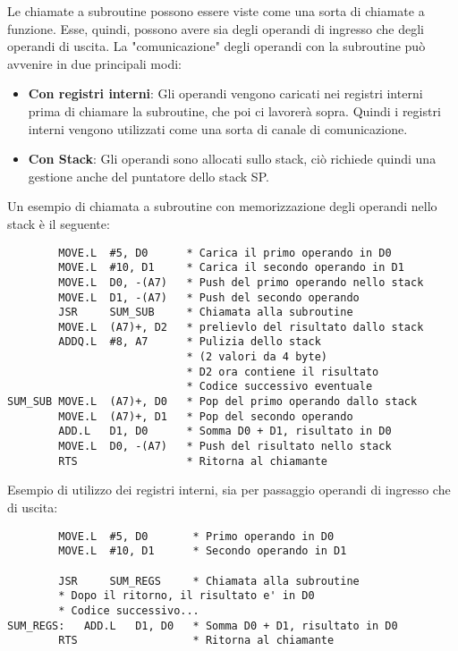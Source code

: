 Le chiamate a subroutine possono essere viste come una sorta di chiamate a funzione. Esse, quindi, possono avere sia degli operandi di ingresso che degli operandi di uscita. La "comunicazione" degli operandi con la subroutine può avvenire in due principali modi:
\begin{itemize}
    \item \textbf{Con registri interni}: Gli operandi vengono caricati nei registri interni prima di chiamare la subroutine, che poi ci lavorerà sopra. Quindi i registri interni vengono utilizzati come una sorta di canale di comunicazione.
    \item \textbf{Con Stack}: Gli operandi sono allocati sullo stack, ciò richiede quindi una gestione anche del puntatore dello stack SP.
\end{itemize}

Un esempio di chiamata a subroutine con memorizzazione degli operandi nello stack è il seguente:
\begin{lstlisting}
        MOVE.L  #5, D0      * Carica il primo operando in D0
        MOVE.L  #10, D1     * Carica il secondo operando in D1
        MOVE.L  D0, -(A7)   * Push del primo operando nello stack
        MOVE.L  D1, -(A7)   * Push del secondo operando
        JSR     SUM_SUB     * Chiamata alla subroutine
        MOVE.L  (A7)+, D2   * prelievlo del risultato dallo stack
        ADDQ.L  #8, A7      * Pulizia dello stack 
                            * (2 valori da 4 byte)
                            * D2 ora contiene il risultato
                            * Codice successivo eventuale
SUM_SUB MOVE.L  (A7)+, D0   * Pop del primo operando dallo stack
        MOVE.L  (A7)+, D1   * Pop del secondo operando
        ADD.L   D1, D0      * Somma D0 + D1, risultato in D0
        MOVE.L  D0, -(A7)   * Push del risultato nello stack
        RTS                 * Ritorna al chiamante
\end{lstlisting}

Esempio di utilizzo dei registri interni, sia per passaggio operandi di ingresso che di uscita:

\begin{lstlisting}
        MOVE.L  #5, D0       * Primo operando in D0
        MOVE.L  #10, D1      * Secondo operando in D1

        JSR     SUM_REGS     * Chiamata alla subroutine
        * Dopo il ritorno, il risultato e' in D0
        * Codice successivo...
SUM_REGS:   ADD.L   D1, D0   * Somma D0 + D1, risultato in D0
        RTS                  * Ritorna al chiamante

\end{lstlisting}

